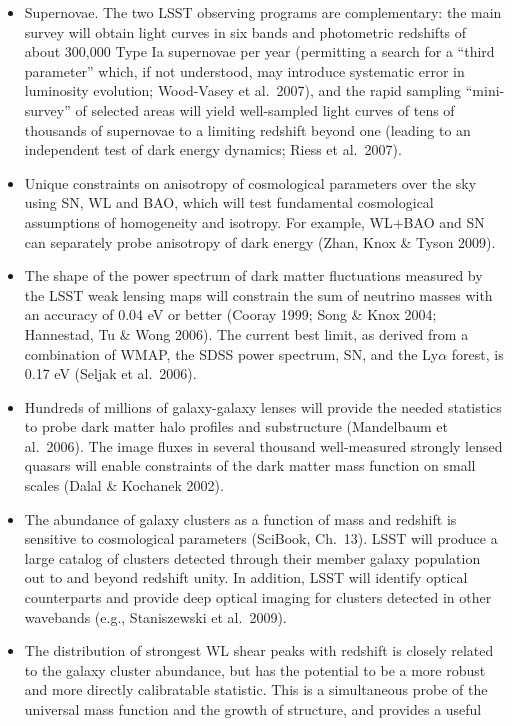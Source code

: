 \documentclass{emulateapj}
\begin{document}
\begin{itemize}
\item Supernovae. The two LSST observing programs are complementary: the main survey will 
obtain light curves in six bands and photometric redshifts of about 300,000 Type
Ia supernovae per year (permitting a search for a ``third parameter'' which,
if not understood, may introduce systematic error in luminosity evolution; 
Wood-Vasey et al.~2007), and the rapid sampling ``mini-survey'' of selected
areas will yield well-sampled light curves of tens of thousands of supernovae
to a limiting redshift beyond one (leading to an independent test of dark energy 
dynamics; Riess et al.~2007). 
\item Unique constraints on anisotropy of cosmological parameters over the sky using
SN, WL and BAO, which will test fundamental cosmological assumptions of homogeneity and isotropy.
For example, WL$+$BAO and SN can separately probe anisotropy of dark energy (Zhan, Knox \& Tyson 2009).
\item The shape of the power spectrum of dark matter fluctuations measured by
the LSST weak lensing maps will constrain the sum of neutrino masses with an accuracy 
of 0.04 eV or better (Cooray 1999; Song \& Knox 2004; Hannestad, Tu \& Wong 2006). 
The current best limit, as derived from a combination of WMAP, the SDSS power spectrum, 
SN, and the Ly$\alpha$ forest, is 0.17 eV (Seljak et al.~2006).
\item Hundreds of millions of galaxy-galaxy lenses will provide the needed statistics to probe dark matter 
halo profiles and substructure (Mandelbaum et al.~2006). The image fluxes in several thousand well-measured
strongly lensed quasars will enable constraints of the dark matter mass function on small scales (Dalal \& Kochanek 2002).
\item The abundance of galaxy clusters as a function of mass and redshift is sensitive to cosmological parameters
(SciBook, Ch.~13). LSST will produce a large catalog of clusters detected through their member galaxy population 
out to and beyond redshift unity.  In addition, LSST will identify optical counterparts and provide deep optical
imaging for clusters detected in other wavebands (e.g., Staniszewski et al.~2009). 
\item The distribution of strongest WL shear peaks with redshift is
  closely related to the galaxy cluster abundance, but has the
  potential to be a more robust and more directly calibratable statistic. This is a simultaneous 
probe of the universal mass function and the growth of structure, and provides a useful 

\end{itemize}
\end{document}
